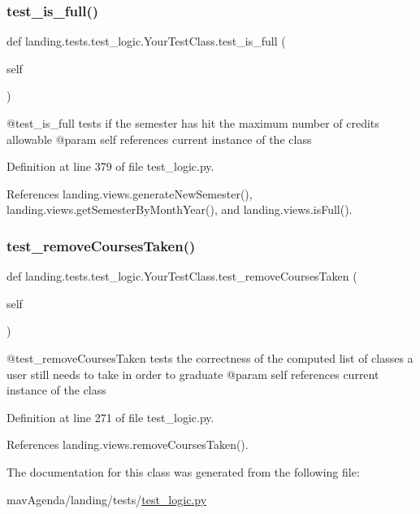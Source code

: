 \subsubsection{\texorpdfstring{test\+\_\+is\+\_\+full()}{test\_is\_full()}}
{\footnotesize\ttfamily def landing.\+tests.\+test\+\_\+logic.\+Your\+Test\+Class.\+test\+\_\+is\+\_\+full (\begin{DoxyParamCaption}\item[{}]{self }\end{DoxyParamCaption})}

\begin{DoxyVerb}@test_is_full tests if the semester has hit the maximum number of credits allowable
@param self references current instance of the class
\end{DoxyVerb}
 

Definition at line 379 of file test\+\_\+logic.\+py.



References landing.\+views.\+generate\+New\+Semester(), landing.\+views.\+get\+Semester\+By\+Month\+Year(), and landing.\+views.\+is\+Full().

\mbox{\label{classlanding_1_1tests_1_1test__logic_1_1YourTestClass_ac0dd592f4aa2af5461ed9e4622e6ff10}} 
\subsubsection{\texorpdfstring{test\+\_\+remove\+Courses\+Taken()}{test\_removeCoursesTaken()}}
{\footnotesize\ttfamily def landing.\+tests.\+test\+\_\+logic.\+Your\+Test\+Class.\+test\+\_\+remove\+Courses\+Taken (\begin{DoxyParamCaption}\item[{}]{self }\end{DoxyParamCaption})}

\begin{DoxyVerb}@test_removeCoursesTaken tests the correctness of the computed list of classes a user still needs to take in order to graduate
@param self references current instance of the class
\end{DoxyVerb}
 

Definition at line 271 of file test\+\_\+logic.\+py.



References landing.\+views.\+remove\+Courses\+Taken().



The documentation for this class was generated from the following file\+:\begin{DoxyCompactItemize}
\item 
mav\+Agenda/landing/tests/\mbox{\hyperlink{test__logic_8py}{test\+\_\+logic.\+py}}\end{DoxyCompactItemize}

